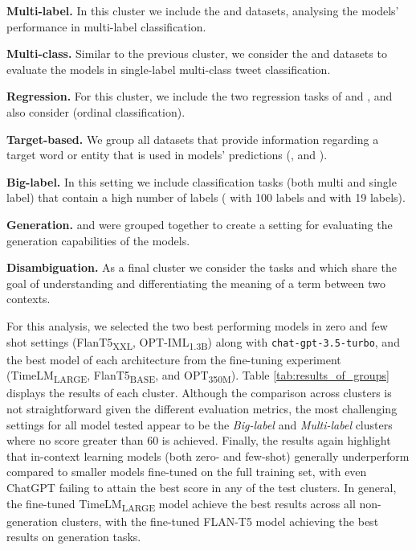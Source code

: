 \textbf{Multi-label.} In this cluster we include the {\TweetTopic} and {\TweetEmotion} datasets, analysing the models' performance in multi-label classification.

\textbf{Multi-class.} Similar to the previous cluster, we consider the {\TweetSentiment} and {\TweetHate} datasets to evaluate the models in single-label multi-class tweet classification.

\textbf{Regression.} For this cluster, we include the two regression tasks of {\TweetSimilarity} and {\TweetIntimacy}, and also consider {\TweetSentiment} (ordinal classification).

\textbf{Target-based.} We group all datasets that provide information regarding a target word or entity that is used in models' predictions ({\TweetSentiment}, {\TempoWiC} and {\TweetNERD}).

\textbf{Big-label.} In this setting we include classification tasks (both multi and single label) that contain a high number of labels ({\TweetEmoji} with 100 labels and {\TweetTopic} with 19 labels).

\textbf{Generation.} {\TweetQA} and {\TweetQG} were grouped together to create a setting for evaluating the generation capabilities of the models.

\textbf{Disambiguation.} As a final cluster we consider the tasks {\TempoWiC} and {\TweetNERD}  which share the goal of understanding and differentiating the meaning of a term between two contexts. 


For this analysis, we selected the two best performing models in zero and few shot settings (FlanT5\textsubscript{XXL}, OPT-IML\textsubscript{1.3B}) along with \texttt{chat-gpt-3.5-turbo}, and the best model of each architecture from the fine-tuning experiment (TimeLM\textsubscript{LARGE}, FlanT5\textsubscript{BASE}, and OPT\textsubscript{350M}). Table \ref{tab:results_of_groups} displays the results of each cluster. Although the comparison across clusters is not straightforward given the different evaluation metrics, the most challenging settings for all model tested appear to be the \textit{Big-label} and \textit{Multi-label} clusters where no score greater than 60 is achieved. Finally, the results again highlight that in-context learning models (both zero- and few-shot) generally underperform compared to smaller models fine-tuned on the full training set, with even ChatGPT failing to attain the best score in any of the test clusters. In general, the fine-tuned TimeLM\textsubscript{LARGE} model achieve the best results across all non-generation clusters, with the fine-tuned FLAN-T5 model achieving the best results on generation tasks.



